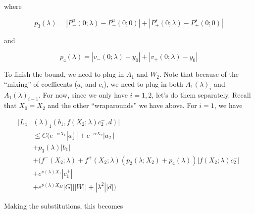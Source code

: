 \documentclass[12pt]{article}
\begin{document}
\begin{enumerate}
where

\[
p_3(\lambda) = |P^u_-(0;\lambda) - P^u_-(0; 0)| + |P^s_+(0;\lambda) - P^s_+(0;0)|
\]

and

\[
p_4(\lambda) = |v_-(0; \lambda) - y_0| + |v_+(0; \lambda) - y_0|
\]

To finish the bound, we need to plug in $A_1$ and $W_2$. Note that because of the ``mixing'' of coefficents ($a_i$ and $c_i$), we need to plug in both $A_1(\lambda)_i$ and $A_1(\lambda)_{i-1}$. For now, since we only have $i = 1, 2$, let's do them separately. Recall that $X_0 = X_2$ and the other ``wraparounds'' we have above. For $i = 1$, we have

\begin{align*}
|L_4&(\lambda)_1(b_1, f(X_2; \lambda) c_2^-, d)|\\ 
&\leq C( e^{-\alpha X_1} |a_1^+| + e^{-\alpha X_2} |a_2^-| \\
&+ p_3(\lambda) |b_1| \\
&+ (f^-(X_2; \lambda) + f^+(X_2; \lambda) (p_2(\lambda; X_2) + p_4(\lambda)) | f(X_2; \lambda) c_2^-| \\
&+ e^{\nu(\lambda)X_1} |c_1^+| \\
&+ e^{\nu(\lambda)X_M}|G| ||W|| + |\lambda^2||d|)
\end{align*}

Making the substitutions, this becomes


\end{enumerate}
\end{document}

